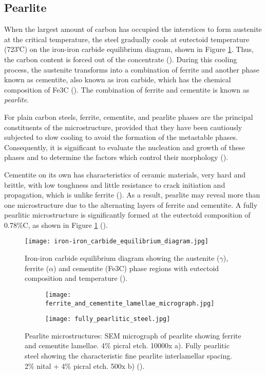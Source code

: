\subsection{Pearlite}
When the largest amount of carbon has occupied the interstices to form austenite at the critical temperature, the steel gradually cools at eutectoid temperature (723℃) on the iron-iron carbide equilibrium diagram, shown in Figure \ref{ch3:figure:equilibrium}. Thus, the carbon content is forced out of the concentrate  (\cite{bhadeshia2017steels}). During this cooling process, the austenite transforms into a combination of ferrite and another phase known as cementite, also known as iron carbide, which has the chemical composition of Fe3C (\cite{cmrp2014maintenance}). The combination of ferrite and cementite is known as \emph{pearlite}.

For plain carbon steels, ferrite, cementite, and pearlite phases are the principal constituents of the microstructure, provided that they have been cautiously subjected to slow cooling to avoid the formation of the metastable phases. Consequently, it is significant to evaluate the nucleation and growth of these phases and to determine the factors which control their morphology (\cite{bhadeshia2017steels}).

Cementite on its own has characteristics of ceramic materials, very hard and brittle, with low toughness and little resistance to crack initiation and propagation, which is unlike ferrite (\cite{bajaj2020steels}). As a result, pearlite may reveal more than one microstructure due to the alternating layers of ferrite and cementite. A fully pearlitic microstructure is significantly formed at the eutectoid composition of 0.78\%C, as shown in Figure \ref{ch3:figure:equilibrium} (\cite{molabe2018determining}).
\begin{figure}[H]
    \centering
    \texttt{[image: iron-iron\_carbide\_equilibrium\_diagram.jpg]}
    \caption{Iron-iron carbide equilibrium diagram showing the austenite ($\gamma$), ferrite ($\alpha$) and cementite (Fe3C) phase regions with eutectoid composition and temperature (\cite{cmrp2014maintenance}).}
    \label{ch3:figure:equilibrium}
\end{figure}
\begin{figure}[H]
\centering
\begin{subfigure}{.45\textwidth}
    \centering
    \texttt{[image: ferrite\_and\_cementite\_lamellae\_micrograph.jpg]}
    \caption{}
\end{subfigure}
\begin{subfigure}{.45\textwidth}
    \centering
    \texttt{[image: fully\_pearlitic\_steel.jpg]}
    \caption{}
\end{subfigure}

\caption{Pearlite microstructures:  SEM micrograph of pearlite showing ferrite and cementite lamellae. 4\% picral etch. 10000x a). Fully pearlitic steel showing the characteristic fine pearlite interlamellar spacing. 2\% nital + 4\% picral etch. 500x b) (\cite{molabe2018determining}).}
\label{ch3:figure:pearlite:microstructures}
\end{figure}

